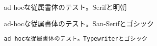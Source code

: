 \documentclass{jsarticle}
\begin{document}
ad-hocな従属書体のテスト。Serifと明朝

\textsf{ad-hocな従属書体のテスト。San-Serifとゴシック}

\texttt{ad-hocな従属書体のテスト。Typewriterとゴシック}
\end{document}
